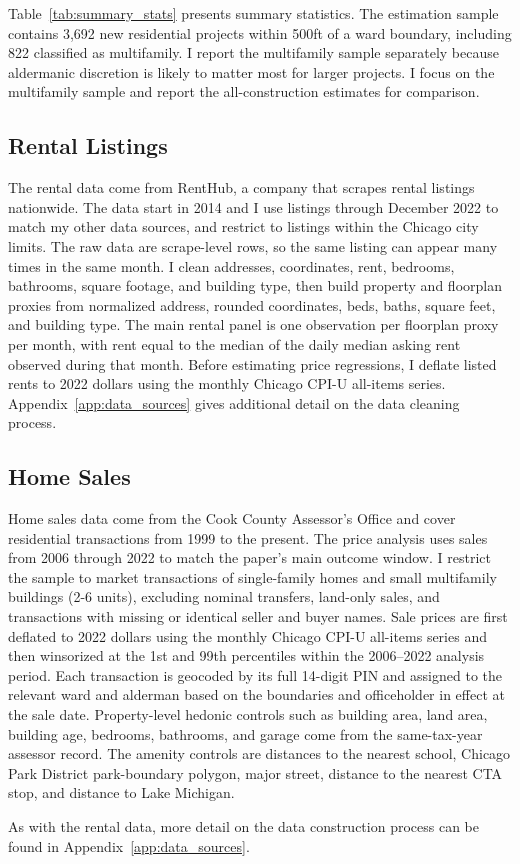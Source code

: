 Table~\ref{tab:summary_stats} presents summary statistics.
The estimation sample contains 3,692 new residential projects within 500ft of a ward boundary, including 822 classified as multifamily.
I report the multifamily sample separately because aldermanic discretion is likely to matter most for larger projects.
I focus on the multifamily sample and report the all-construction estimates for comparison.



\subsection{Rental Listings}

The rental data come from RentHub, a company that scrapes rental listings nationwide.
The data start in 2014 and I use listings through December 2022 to match my other data sources, and restrict to listings within the Chicago city limits.
The raw data are scrape-level rows, so the same listing can appear many times in the same month.
I clean addresses, coordinates, rent, bedrooms, bathrooms, square footage, and building type, then build property and floorplan proxies from normalized address, rounded coordinates, beds, baths, square feet, and building type.
The main rental panel is one observation per floorplan proxy per month, with rent equal to the median of the daily median asking rent observed during that month.
Before estimating price regressions, I deflate listed rents to 2022 dollars using the monthly Chicago CPI-U all-items series.
Appendix~\ref{app:data_sources} gives additional detail on the data cleaning process.

\subsection{Home Sales}

Home sales data come from the Cook County Assessor's Office and cover residential transactions from 1999 to the present.
The price analysis uses sales from 2006 through 2022 to match the paper's main outcome window.
I restrict the sample to market transactions of single-family homes and small multifamily buildings (2-6 units), excluding nominal transfers, land-only sales, and transactions with missing or identical seller and buyer names.
Sale prices are first deflated to 2022 dollars using the monthly Chicago CPI-U all-items series and then winsorized at the 1st and 99th percentiles within the 2006--2022 analysis period.
Each transaction is geocoded by its full 14-digit PIN and assigned to the relevant ward and alderman based on the boundaries and officeholder in effect at the sale date.
Property-level hedonic controls such as building area, land area, building age, bedrooms, bathrooms, and garage come from the same-tax-year assessor record.
The amenity controls are distances to the nearest school, Chicago Park District park-boundary polygon, major street, distance to the nearest CTA stop, and distance to Lake Michigan.

As with the rental data, more detail on the data construction process can be found in Appendix~\ref{app:data_sources}.
